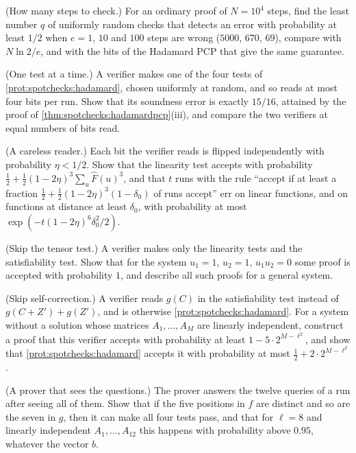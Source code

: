 \begin{refsection}
\begin{exercises}
\item \consolidation (How many steps to check.) For an ordinary proof of $N=10^4$ steps, find the least number $q$ of uniformly random checks that detects an error with probability at least $1/2$ when $e=1$, $10$ and $100$ steps are wrong ($5000$, $670$, $69$), compare with $N\ln2/e$, and with the bits of the Hadamard PCP that give the same guarantee.\label{ex:spotchecks:naive}

\item \variation\hard (One test at a time.) A verifier makes one of the four tests of \cref{prot:spotchecks:hadamard}, chosen uniformly at random, and so reads at most four bits per run. Show that its soundness error is exactly $15/16$, attained by the proof of \cref{thm:spotchecks:hadamardpcp}(iii), and compare the two verifiers at equal numbers of bits read. \label{ex:spotchecks:onetest}

\item \variation (A careless reader.) Each bit the verifier reads is flipped independently with probability $\eta<1/2$. Show that the linearity test accepts with probability $\frac12+\frac12(1-2\eta)^3\sum_u\hat F(u)^3$, and that $t$ runs with the rule ``accept if at least a fraction $\frac12+\frac12(1-2\eta)^3(1-\delta_0)$ of runs accept'' err on linear functions, and on functions at distance at least $\delta_0$, with probability at most $\exp(-t(1-2\eta)^6\delta_0^2/2)$.\label{ex:spotchecks:noisy}

\item \attack (Skip the tensor test.) A verifier makes only the linearity tests and the satisfiability test. Show that for the system $u_1=1$, $u_2=1$, $u_1u_2=0$ some proof is accepted with probability $1$, and describe all such proofs for a general system.\label{ex:spotchecks:notensor}

\item \attack (Skip self-correction.) A verifier reads $g(C)$ in the satisfiability test instead of $g(C+Z')+g(Z')$, and is otherwise \cref{prot:spotchecks:hadamard}. For a system without a solution whose matrices $A_1,\dots,A_M$ are linearly independent, construct a proof that this verifier accepts with probability at least $1-5\cdot2^{M-\ell^2}$, and show that \cref{prot:spotchecks:hadamard} accepts it with probability at most $\frac12+2\cdot2^{M-\ell^2}$.\label{ex:spotchecks:noselfcorrect}

\item \attack (A prover that sees the questions.) The prover answers the twelve queries of a run after seeing all of them. Show that if the five positions in $f$ are distinct and so are the seven in $g$, then it can make all four tests pass, and that for $\ell=8$ and linearly independent $A_1,\dots,A_{12}$ this happens with probability above $0.95$, whatever the vector $b$.\label{ex:spotchecks:adaptive}


\end{exercises}
\end{refsection}
